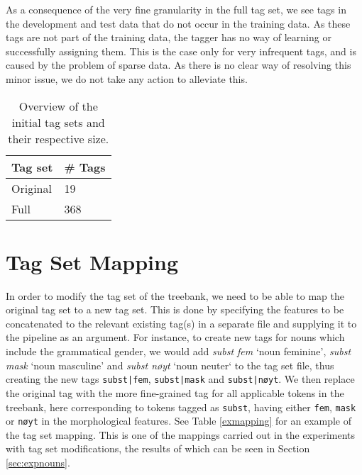 \documentclass[a4paper,12pt,english]{book}
\begin{document}
As a consequence of the very fine granularity in the full tag set, we see tags
in the development and test data that do not occur in the training data. As
these tags are not part of the training data, the tagger has no way of learning
or successfully assigning them. This is the case only for very infrequent tags,
and is caused by the problem of sparse data. As there is no clear way of
resolving this minor issue, we do not take any action to alleviate this.

\begin{table}
    \centering
    \smaller[0.5]
    \begin{tabular}{@{}ll@{}}
        \toprule
        \textbf{Tag set} & \textbf{\# Tags} \\
        \midrule
        Original & 19 \\
        Full & 368 \\
        \bottomrule
    \end{tabular}
    \caption{Overview of the initial tag sets and their respective size.}
    \label{ndttagsets}
\end{table}

\section{Tag Set Mapping}
\label{sec:mapping}
In order to modify the tag set of the treebank, we need to be able to map the
original tag set to a new tag set. This is done by specifying the features to
be concatenated to the relevant existing tag(s) in a separate file and
supplying it to the pipeline as an argument. For instance, to create new tags
for nouns which include the grammatical gender, we would add \emph{subst fem}
`noun feminine', \emph{subst mask} `noun masculine' and \emph{subst nøyt} `noun
neuter` to the tag set file, thus creating the new tags \texttt{subst|fem},
\texttt{subst|mask} and \texttt{subst|nøyt}. We then replace the original tag
with the more fine-grained tag for all applicable tokens in the treebank, here
corresponding to tokens tagged as \texttt{subst}, having either \texttt{fem},
\texttt{mask} or \texttt{nøyt} in the morphological features. See Table
\ref{exmapping} for an example of the tag set mapping. This is one of the
mappings carried out in the experiments with tag set modifications, the results
of which can be seen in Section \ref{sec:expnouns}.
\end{document}
